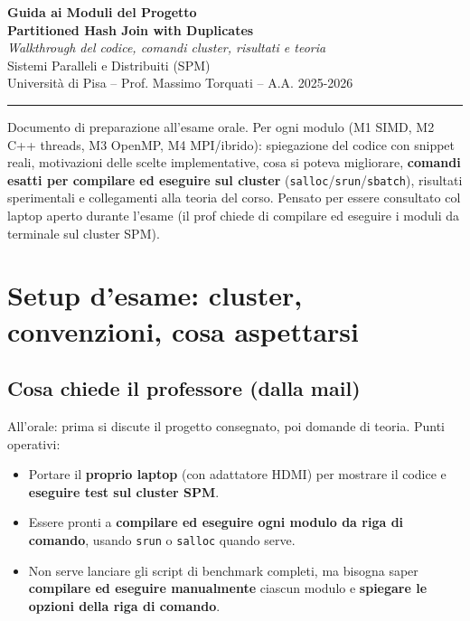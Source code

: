 \documentclass[11pt,a4paper]{article}
\begin{document}
\begin{titlepage}
\centering
\vspace*{1.5cm}
{\LARGE\bfseries Guida ai Moduli del Progetto\\[0.4em]
Partitioned Hash Join with Duplicates\\[1em]}
{\large\itshape Walkthrough del codice, comandi cluster, risultati e teoria}\\[1.5em]
{\large Sistemi Paralleli e Distribuiti (SPM)}\\[0.4em]
{\large Università di Pisa -- Prof. Massimo Torquati -- A.A. 2025-2026}\\[2em]
\hrule\vspace{1em}
\begin{flushleft}\small
Documento di preparazione all'esame orale. Per ogni modulo (M1 SIMD, M2 C++ threads, M3 OpenMP, M4 MPI/ibrido):
spiegazione del codice con snippet reali, motivazioni delle scelte implementative, cosa si poteva migliorare,
\textbf{comandi esatti per compilare ed eseguire sul cluster} (\texttt{salloc}/\texttt{srun}/\texttt{sbatch}),
risultati sperimentali e collegamenti alla teoria del corso. Pensato per essere consultato col laptop aperto
durante l'esame (il prof chiede di compilare ed eseguire i moduli da terminale sul cluster SPM).
\end{flushleft}
\end{titlepage}

\tableofcontents
\newpage

\section{Setup d'esame: cluster, convenzioni, cosa aspettarsi}

\subsection{Cosa chiede il professore (dalla mail)}

All'orale: prima si discute il progetto consegnato, poi domande di teoria. Punti operativi:
\begin{itemize}
  \item Portare il \textbf{proprio laptop} (con adattatore HDMI) per mostrare il codice e \textbf{eseguire test sul cluster SPM}.
  \item Essere pronti a \textbf{compilare ed eseguire ogni modulo da riga di comando}, usando \texttt{srun} o \texttt{salloc} quando serve.
  \item Non serve lanciare gli script di benchmark completi, ma bisogna saper \textbf{compilare ed eseguire manualmente} ciascun modulo e \textbf{spiegare le opzioni della riga di comando}.
\end{itemize}
\end{document}
